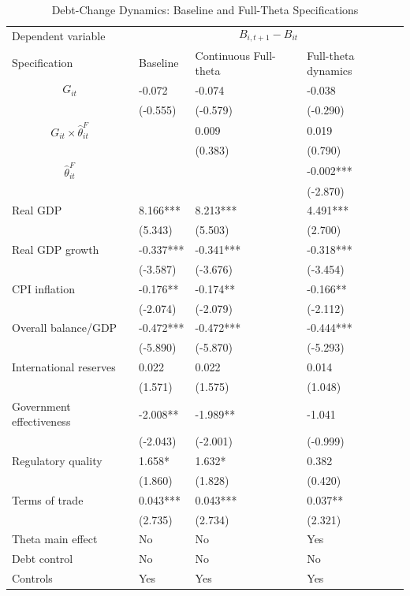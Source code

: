 \begin{table}[H]\centering
\begin{threeparttable}
\caption{Debt-Change Dynamics: Baseline and Full-Theta Specifications}
\label{tab:debt_change_combined_fulltheta}
\scriptsize
\begin{tabularx}{\textwidth}{lYYY}
\toprule
Dependent variable &  \\
\cmidrule(lr){2-4}
Specification & Baseline & Continuous Full-theta & Full-theta dynamics \\
\midrule
$$G_{it}$$ & -0.072 & -0.074 & -0.038 \\
 & (-0.555) & (-0.579) & (-0.290) \\
$$G_{it}\times\widehat{\theta}^{F}_{it}$$ &  & 0.009 & 0.019 \\
 &  & (0.383) & (0.790) \\
$$\widehat{\theta}^{F}_{it}$$ &  &  & -0.002*** \\
 &  &  & (-2.870) \\
Real GDP & 8.166*** & 8.213*** & 4.491*** \\
 & (5.343) & (5.503) & (2.700) \\
Real GDP growth & -0.337*** & -0.341*** & -0.318*** \\
 & (-3.587) & (-3.676) & (-3.454) \\
CPI inflation & -0.176** & -0.174** & -0.166** \\
 & (-2.074) & (-2.079) & (-2.112) \\
Overall balance/GDP & -0.472*** & -0.472*** & -0.444*** \\
 & (-5.890) & (-5.870) & (-5.293) \\
International reserves & 0.022 & 0.022 & 0.014 \\
 & (1.571) & (1.575) & (1.048) \\
Government effectiveness & -2.008** & -1.989** & -1.041 \\
 & (-2.043) & (-2.001) & (-0.999) \\
Regulatory quality & 1.658* & 1.632* & 0.382 \\
 & (1.860) & (1.828) & (0.420) \\
Terms of trade & 0.043*** & 0.043*** & 0.037** \\
 & (2.735) & (2.734) & (2.321) \\
\midrule
Theta main effect & No & No & Yes \\
Debt control & No & No & No \\
Controls & Yes & Yes & Yes \\

\end{tabularx}
\end{threeparttable}
\end{table}
